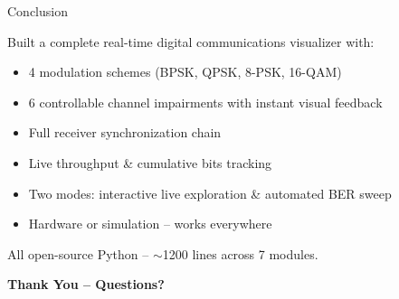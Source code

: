 \documentclass[aspectratio=169, 12pt]{beamer}
\begin{document}
\begin{frame}{Conclusion}
\begin{center}
\begin{minipage}{0.85\textwidth}
\large
Built a \alert{complete real-time digital communications visualizer} with:
\vspace{0.3cm}
\begin{itemize}
    \item[\checkmark] 4 modulation schemes (BPSK, QPSK, 8-PSK, 16-QAM)
    \item[\checkmark] 6 controllable channel impairments with instant visual feedback
    \item[\checkmark] Full receiver synchronization chain
    \item[\checkmark] Live throughput \& cumulative bits tracking
    \item[\checkmark] Two modes: interactive live exploration \& automated BER sweep
    \item[\checkmark] Hardware or simulation -- works everywhere
\end{itemize}
\vspace{0.5cm}
All open-source Python -- $\sim$1200 lines across 7 modules.
\end{minipage}
\end{center}
\vfill
\begin{center}
\Large\textbf{\color{yellow!80}Thank You -- Questions?}
\end{center}
\end{frame}
\end{document}
